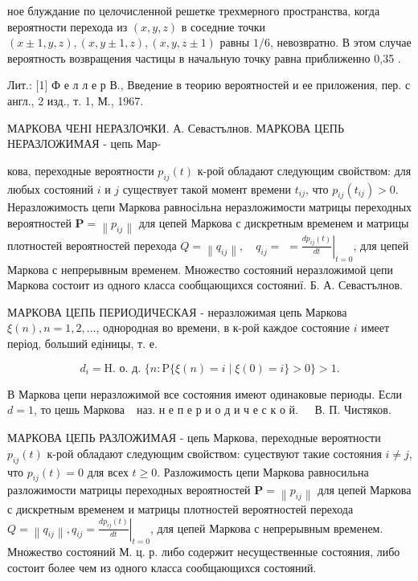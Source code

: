 \documentclass[10pt]{article}
\begin{document}
ное блуждание по целочисленной решетке трехмерного пространства, когда вероятности перехода из $(x, y, z)$ в соседние точки $(x \pm 1, y, z),(x, y \pm 1, z),(x, y, z \pm 1)$ равны $1 / 6$, невозвратно. В этом случае вероятность возвращения частицы в начальную точку равна приближенно 0,35 .



Лит.: [1] Ф е л л е р В., Введение в теорию вероятностей и ее приложения, пер. с англ., 2 изд., т. 1, М., 1967.



МАРКОВА ЧЕНІ НЕРАЗЛОभКИ. А. Севастълнов. МАРКОВА ЦЕПЬ НЕРАЗЛОЖИМАЯ - цепь Мар-

кова, переходные вероятности $p_{i j}(t)$ к-рой обладают следующим свойством: для любых состояний $i$ и $j$ существует такой момент времени $t_{i j}$, что $p_{i j}\left(t_{i j}\right)>0$. Неразложимость цепи Маркова равносільна неразложимости матрицы переходных вероятностей $\mathbf{P}=\left\|p_{i j}\right\|$ для цепей Маркова с дискретным временем и матрицы плотностей вероятностей перехода $Q=\left\|q_{i j}\right\|, \quad q_{i j}=$ $=\left.\frac{d p_{i j}(t)}{d t}\right|_{t=0}$, для цепей Маркова с непрерывным временем. Множество состояний неразложимой цепи Маркова состоит из одного класса сообщающихся состояниї. Б. А. Севастълнов.



МАРКОВА ЦЕПЬ ПЕРИОДИЧЕСКАЯ - неразложимая цепь Маркова $\xi(n), n=1,2, \ldots$, однородная во времени, в к-рой каждое состояние $i$ имеет період, больший едіницы, т. е.



\[

d_{i}=\mathrm{H} \text {. о. д. }\{n: \mathrm{P}\{\xi(n)=i \mid \xi(0)=i\}>0\}>1 .

\]



В Маркова цепи неразложимой все состояния имеют одинаковые периоды. Если $d=1$, то цешь Маркова $\begin{array}{ll}\text { наз. н е п е р и о д и ч е с к о й. } & \text { В. П. Чистяков. }\end{array}$



МАРКОВА ЦЕПЬ РАЗЛОЖИМАЯ - цепь Маркова, переходные вероятности $p_{i j}(t)$ к-рой обладают следующим свойством: суцествуют такие состояния $i \neq j$, что $p_{i j}(t)=0$ для всех $t \geqslant 0$. Разложимость цепи Маркова равносильна разложимости матрицы переходных вероятностей $\mathbf{P}=\left\|p_{i j}\right\|$ для цепей Маркова с дискретным временем и матрицы плотностей вероятностей перехода $Q=\left\|q_{i j}\right\|, q_{i j}=\left.\frac{d p_{i j}(t)}{d t}\right|_{t=0}$, для цепей Маркова с непрерывным временем. Множество состояний М. ц. р. либо содержит несущественные состояния, либо состоит более чем из одного класса сообщающихся состояний.
\end{document}
